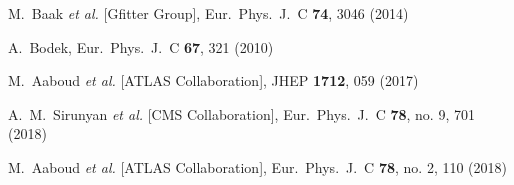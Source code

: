 \documentclass{moriond}
\begin{document}
\begin{thebibliography}{99}
  M.~Baak {\it et al.} [Gfitter Group],
  Eur.\ Phys.\ J.\ C {\bf 74}, 3046 (2014)

  A.~Bodek,
  Eur.\ Phys.\ J.\ C {\bf 67}, 321 (2010)

  M.~Aaboud {\it et al.} [ATLAS Collaboration],
  JHEP {\bf 1712}, 059 (2017)

  A.~M.~Sirunyan {\it et al.} [CMS Collaboration],
  Eur.\ Phys.\ J.\ C {\bf 78}, no. 9, 701 (2018)

  M.~Aaboud {\it et al.} [ATLAS Collaboration],
  Eur.\ Phys.\ J.\ C {\bf 78}, no. 2, 110 (2018)
  
\end{thebibliography}
\end{document}
